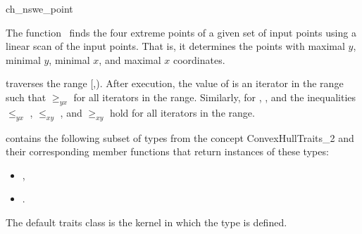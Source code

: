 

\begin{ccRefFunction}{ch_nswe_point}  %

\ccDefinition
  
The function \ccRefName\ finds the four extreme points of a given set  
of input points using a linear scan of the input points.  
That is, it determines the points with maximal $y$, minimal $y$,
minimal $x$, and maximal $x$ coordinates.


           {traverses the range [,).
            After execution, the value of
             is an iterator in the range such that  $\ge_{yx}$
             for all iterators  in the range. Similarly, for
            , , and  the inequalities  $\le_{yx}$
            ,  $\le_{xy}$ , and 
            $\ge_{xy}$  hold for all iterators
             in the range.}


 contains the following subset of types from
the concept ConvexHullTraits\_2 and their corresponding member
functions that return instances of these types:
            \begin{itemize}
                \item {}, 
                \item {}.
            \end{itemize}

The default traits class  is the kernel in which the
type  is defined.

\ccSeeAlso

 \\
 \\
 \\
 \\
 \\

\end{ccRefFunction}


